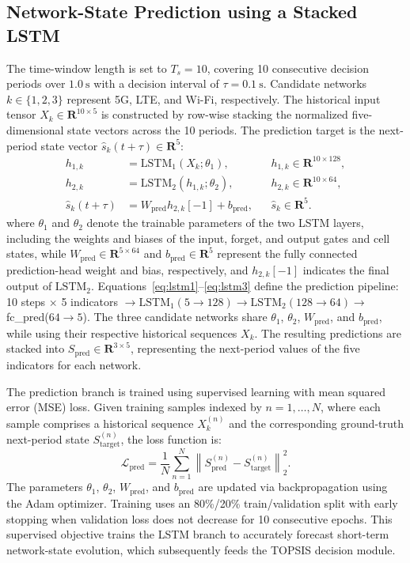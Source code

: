 \documentclass[final,3p,times,twocolumn]{elsarticle}
\begin{document}
\subsection{Network-State Prediction using a Stacked LSTM}\label{sec:pred}

The time-window length is set to $T_s=10$, covering 10 consecutive decision periods over $1.0~\mathrm{s}$ with a decision interval of $\tau=0.1~\mathrm{s}$. Candidate networks $k\in\{1,2,3\}$ represent 5G, LTE, and Wi-Fi, respectively. The historical input tensor $X_k\in\mathbf{R}^{10\times5}$ is constructed by row-wise stacking the normalized five-dimensional state vectors across the 10 periods. The prediction target is the next-period state vector $\hat{s}_k(t+\tau)\in\mathbf{R}^5$:
\begin{align}
h_{1,k} &= \mathrm{LSTM}_1(X_k;\theta_1), && h_{1,k}\in\mathbf{R}^{10\times128}, \label{eq:lstm1}\\
h_{2,k} &= \mathrm{LSTM}_2(h_{1,k};\theta_2), && h_{2,k}\in\mathbf{R}^{10\times64}, \label{eq:lstm2}\\
\hat{s}_k(t+\tau) &= W_{\mathrm{pred}}h_{2,k}[-1]+b_{\mathrm{pred}}, && \hat{s}_k\in\mathbf{R}^5. \label{eq:lstm3}
\end{align}
where $\theta_1$ and $\theta_2$ denote the trainable parameters of the two LSTM layers, including the weights and biases of the input, forget, and output gates and cell states, while $W_{\mathrm{pred}}\in\mathbf{R}^{5\times64}$ and $b_{\mathrm{pred}}\in\mathbf{R}^5$ represent the fully connected prediction-head weight and bias, respectively, and $h_{2,k}[-1]$ indicates the final output of $\mathrm{LSTM}_2$. Equations~\eqref{eq:lstm1}--\eqref{eq:lstm3} define the prediction pipeline: 10 steps $\times$ 5 indicators $\rightarrow\mathrm{LSTM}_1(5\rightarrow128)\rightarrow\mathrm{LSTM}_2(128\rightarrow64)\rightarrow$fc\_pred($64\rightarrow5$). The three candidate networks share $\theta_1$, $\theta_2$, $W_{\mathrm{pred}}$, and $b_{\mathrm{pred}}$, while using their respective historical sequences $X_k$. The resulting predictions are stacked into $S_{\mathrm{pred}}\in\mathbf{R}^{3\times5}$, representing the next-period values of the five indicators for each network.

The prediction branch is trained using supervised learning with mean squared error (MSE) loss. Given training samples indexed by $n=1,\ldots,N$, where each sample comprises a historical sequence $X_k^{(n)}$ and the corresponding ground-truth next-period state $S_{\mathrm{target}}^{(n)}$, the loss function is:
\begin{equation}
\mathcal{L}_{\mathrm{pred}} = \frac{1}{N}\sum_{n=1}^{N}\left\|S_{\mathrm{pred}}^{(n)} - S_{\mathrm{target}}^{(n)}\right\|_2^2. \label{eq:loss_pred}
\end{equation}
The parameters $\theta_1$, $\theta_2$, $W_{\mathrm{pred}}$, and $b_{\mathrm{pred}}$ are updated via backpropagation using the Adam optimizer. Training uses an 80\%/20\% train/validation split with early stopping when validation loss does not decrease for 10 consecutive epochs. This supervised objective trains the LSTM branch to accurately forecast short-term network-state evolution, which subsequently feeds the TOPSIS decision module.
\end{document}
